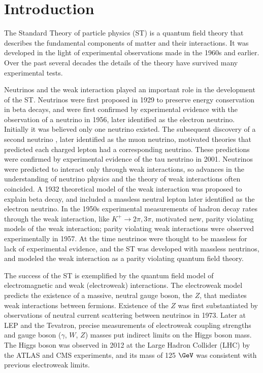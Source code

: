 \chapter{Introduction}
\label{intro_chapter}

The Standard Theory of particle physics (ST) \cite{weinbergSM,salamSM} 
is a quantum field theory that describes the fundamental components of matter and their interactions.  It 
was developed in the light of experimental observations made in the 1960s and earlier.  Over the past 
several decades the details of the theory have survived many experimental tests.

Neutrinos and the weak interaction played an important role in the development of the ST.  
Neutrinos were first proposed in 1929 to preserve energy conservation in beta decays, and were first 
confirmed by experimental evidence \cite{firstNuDiscovery} with the observation of a neutrino in 1956, 
later identified as the electron neutrino.  Initially it was believed only one neutrino existed.  The 
subsequent discovery of a second neutrino \cite{muNuDiscovery}, later identified as the muon neutrino, 
motivated theories that predicted each charged lepton had a corresponding neutrino.  These predictions 
were confirmed by experimental evidence \cite{tauNuDiscovery} of the tau neutrino in 2001.  
Neutrinos were predicted to interact only through weak 
interactions, so advances in the understanding of neutrino physics and the theory of weak interactions often coincided.  
A 1932 theoretical model of the weak interaction was proposed to explain beta decay, and included a massless 
neutral lepton later identified as the electron neutrino.  In the 1950s experimental measurements of 
hadron decay rates through the weak interaction, like $K^{+} \rightarrow 2\pi, 3\pi$, motivated new, 
parity violating models of the weak interaction; parity violating weak interactions were 
observed experimentally \cite{weakParityViolation} in 1957.  At the time neutrinos were thought 
to be massless for lack of experimental evidence, and the ST was developed with massless neutrinos, and 
modeled the weak interaction as a parity violating quantum field theory.

The success of the ST is exemplified by the quantum field model of electromagnetic and weak (electroweak) 
interactions.  The electroweak model predicts the existence of a massive, neutral gauge boson, the $Z$, 
that mediates weak interactions between fermions.  Existence of the $Z$ was first substantiated by 
observations of neutral current scattering between neutrinos \cite{nuScattering} in 1973.  Later at 
LEP and the Tevatron, precise measurements of electroweak coupling strengths and gauge boson ($\gamma$, $W$, $Z$) 
masses put indirect limits on the Higgs boson mass.  The Higgs boson was observed in 2012 at the Large Hadron Collider 
(LHC) by the ATLAS and CMS experiments, and its mass\cite{combinedHiggsResult} of 125 $\GeV$ was consistent 
with previous electroweak limits.

